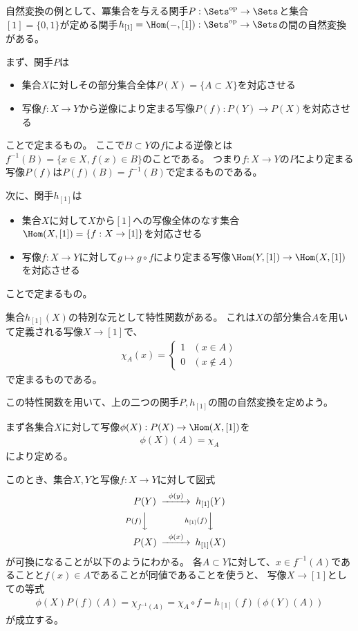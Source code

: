 \documentclass[uplatex]{jsarticle}
\begin{document}
\begin{eg}
自然変換の例として、冪集合を与える関手$P:\Sets^{\rm op} \to \Sets$と集合$[1]=\{0,1\}$が定める関手$h_{[1]}=\Hom(-,[1]):\Sets^{\rm op} \to \Sets$の間の自然変換がある。

まず、関手$P$は
\begin{itemize}
\item 集合$X$に対しその部分集合全体$P(X)=\{A \subset X\}$を対応させる
\item 写像$f:X \to Y$から逆像により定まる写像$P(f):P(Y) \to P(X)$を対応させる
\end{itemize}
ことで定まるもの。
ここで$B \subset Y$の$f$による逆像とは$f^{-1}(B)=\{x \in X, f(x)\in B\}$のことである。
つまり$f:X \to Y$の$P$により定まる写像$P(f)$は$P(f)(B)= f^{-1}(B)$で定まるものである。

次に、関手$h_{[1]}$は
\begin{itemize}
\item 集合$X$に対して$X$から$[1]$への写像全体のなす集合$\Hom(X,[1])=\{f:X \to [1]\}$を対応させる
\item 写像$f:X \to Y$に対して$g \mapsto g \circ f$により定まる写像$\Hom(Y,[1]) \to \Hom(X,[1])$を対応させる
\end{itemize}
ことで定まるもの。

集合$h_{[1]}(X)$の特別な元として特性関数がある。
これは$X$の部分集合$A$を用いて定義される写像$X \to [1]$で、
\begin{align*}
\chi_A(x)=\begin{cases}1 & (x\in A) \\ 0 & (x\notin A)\end{cases}
\end{align*}
で定まるものである。

この特性関数を用いて、上の二つの関手$P, h_{[1]}$の間の自然変換を定めよう。

まず各集合$X$に対して写像$\phi(X):P(X) \to \Hom(X,[1])$を
\begin{align*}
\phi(X)(A) = \chi_A
\end{align*}
により定める。

このとき、集合$X, Y$と写像$f:X \to Y$に対して図式
\[
\begin{CD}
P(Y)@>\phi(y)>>h_{[1]}(Y)\\
@VP(f)VV@Vh_{[1]}(f)VV\\
P(X)@>\phi(x)>>h_{[1]}(X)
\end{CD}
\]
が可換になることが以下のようにわかる。
各$A \subset Y$に対して、$x\in f^{-1}(A)$であることと$f(x)\in A$であることが同値であることを使うと、
写像$X \to [1]$としての等式
\begin{align*}
\phi(X)P(f)(A)=\chi_{f^{-1}(A)}=\chi_A\circ f=h_{[1]}(f)(\phi(Y)(A))
\end{align*}
が成立する。
\end{eg}
\end{document}
